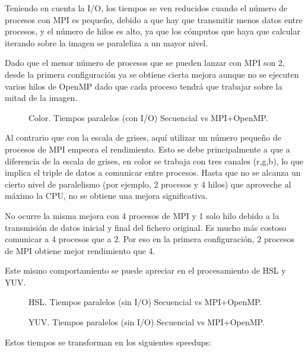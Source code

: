 \documentclass[12pt]{report} %
\begin{document}
Teniendo en cuenta la I/O, los tiempos se ven reducidos cuando el número de procesos con MPI es pequeño,
debido a que hay que transmitir menos datos entre procesos, y el número de hilos es alto, ya que los
cómputos que haya que calcular iterando sobre la imagen se paraleliza a un mayor nivel.

Dado que el menor número de procesos que se pueden lanzar con MPI son 2, desde la primera configuración
ya se obtiene cierta mejora aunque no se ejecuten varios hilos de OpenMP dado que cada proceso tendrá que
trabajar sobre la mitad de la imagen.


\begin{figure}[H]
	\makebox[\textwidth][c]{
        
    }
    \caption{Color. Tiempos paralelos (con I/O) Secuencial vs MPI+OpenMP.}
    \label{fig:color_tiempos}
\end{figure}

Al contrario que con la escala de grises, aquí utilizar un número pequeño de procesos de MPI empeora el
rendimiento. Esto se debe principalmente a que a diferencia de la escala de grises, en color se trabaja
con tres canales (r,g,b), lo que implica el triple de datos a comunicar entre procesos. Hasta que no se
alcanza un cierto nivel de paralelismo (por ejemplo, 2 procesos y 4 hilos) que aproveche al máximo la CPU,
no se obtiene una mejora significativa.

No ocurre la misma mejora con 4 procesos de MPI y 1 solo hilo debido a la transmisión de datos inicial y
final del fichero original. Es mucho más costoso comunicar a 4 procesos que a 2. Por eso en la primera
configuración, 2 procesos de MPI obtiene mejor rendimiento que 4.

Este mismo comportamiento se puede apreciar en el procesamiento de HSL y YUV.

\begin{figure}[H]
	\makebox[\textwidth][c]{
        
    }
    \caption{HSL. Tiempos paralelos (sin I/O) Secuencial vs MPI+OpenMP.}
    \label{fig:hsl_tiempos}
\end{figure}

\begin{figure}[H]
	\makebox[\textwidth][c]{
        
    }
    \caption{YUV. Tiempos paralelos (sin I/O) Secuencial vs MPI+OpenMP.}
    \label{fig:yuv_tiempos}
\end{figure}

Estos tiempos se transforman en los siguientes speedups:
\end{document}
